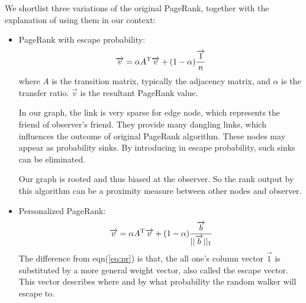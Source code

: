 \documentclass[11pt,a4paper]{article}
\begin{document}
We shortlist three variations\cite{aggarwal2011social} of the original 
PageRank, together with the explanation of using them in our context:
		\begin{itemize}
			\item PageRank with escape probability:
			\begin{equation}
				\overrightarrow{v} = \alpha A^{\rm T}\overrightarrow{v}
				+ (1-\alpha)\frac{\overrightarrow{1}}{n}
				\label{eq:pr}
			\end{equation}
			where $A$ is the transition matrix, typically the adjacency matrix,
			and $\alpha$ is the transfer ratio. $ \overrightarrow{v} $ is 
			the resultant PageRank value. 
			
			In our graph, the link is very sparse for edge node, which 
			represents the friend of observer's friend. They provide 
			many dangling links, which influences the outcome of 
			original PageRank algorithm. These nodes may appear as probability
			sinks. By introducing in escape probability, such sinks can be eliminated. 
			
			Our graph is rooted and thus biased at the observer. So the
			rank output by this algorithm can be a proximity 
			measure between other nodes and observer. 
			
			\item Personalized PageRank:
			\begin{equation}
				\overrightarrow{v} = \alpha A^{\rm T}\overrightarrow{v}
				+ (1-\alpha)\frac{\overrightarrow{b}}{||\overrightarrow{b}||_1}
				\label{eq:ppr}
			\end{equation}
			The difference from eqn(\ref{eq:pr}) is that, the all one's column vector 
			$\overrightarrow{1}$ is 
			substituted by a more general weight vector, also called the 
			escape vector. This vector describes where and by what probability 
			the random walker will escape to. 		
			

\end{itemize}
\end{document}
